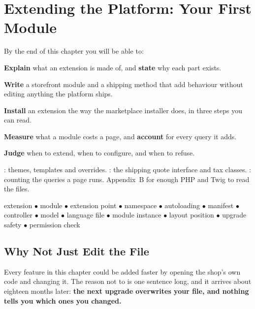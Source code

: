 \chapter{Extending the Platform: Your First Module}\label{ch:modules}

\begin{outcomes}
By the end of this chapter you will be able to:
\begin{tight}
  \item \textbf{Explain} what an extension is made of, and \textbf{state} why
        each part exists.
  \item \textbf{Write} a storefront module and a shipping method that add
        behaviour without editing anything the platform ships.
  \item \textbf{Install} an extension the way the marketplace installer does,
        in three steps you can read.
  \item \textbf{Measure} what a module costs a page, and \textbf{account} for
        every query it adds.
  \item \textbf{Judge} when to extend, when to configure, and when to refuse.
\end{tight}
\end{outcomes}

\begin{prereq}
: themes, templates and overrides. : the shipping
quote interface and tax classes. : counting the queries a page
runs. Appendix~B for enough PHP and Twig to read the files.
\end{prereq}

\begin{keyterms}
extension $\bullet$ module $\bullet$ extension point $\bullet$ namespace
$\bullet$ autoloading $\bullet$ manifest $\bullet$ controller $\bullet$ model
$\bullet$ language file $\bullet$ module instance $\bullet$ layout position
$\bullet$ upgrade safety $\bullet$ permission check
\end{keyterms}

\section{Why Not Just Edit the File}

Every feature in this chapter could be added faster by opening the shop's own
code and changing it. The reason not to is one sentence long, and it arrives
about eighteen months later: \textbf{the next upgrade overwrites your file, and
nothing tells you which ones you changed.}

